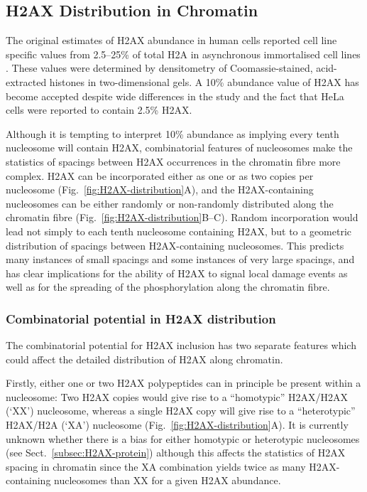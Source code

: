 \documentclass[graybox]{svmult}
\begin{document}
\subsection{H2AX Distribution in Chromatin}
\label{subsec:H2AX-distribution}
The original estimates of H2AX abundance in human cells reported cell line specific values from
2.5--25\% of total H2A in asynchronous immortalised cell lines \cite{EPR+98}. These values were
determined by densitometry of Coomassie-stained, acid-extracted histones in two-dimensional gels. A
10\% abundance value of H2AX has become accepted despite wide differences in the study and the fact
that HeLa cells were reported to contain 2.5\% H2AX\@.

Although it is tempting to interpret 10\% abundance as implying every tenth nucleosome will contain
H2AX, combinatorial features of nucleosomes make the statistics of spacings between H2AX occurrences
in the chromatin fibre more complex. H2AX can be incorporated either as one or as two copies per
nucleosome (Fig.~\ref{fig:H2AX-distribution}A), and the H2AX-containing nucleosomes can be either
randomly or non-randomly distributed along the chromatin fibre (Fig.~\ref{fig:H2AX-distribution}B--C).
Random incorporation would lead not simply to each tenth nucleosome containing H2AX, but to a
geometric distribution of spacings between H2AX-containing nucleosomes. This predicts many instances
of small spacings and some instances of very large spacings, and has clear implications for the
ability of \ugamma H2AX to signal local damage events as well as for the spreading of the
phosphorylation along the chromatin fibre.

\subsubsection{Combinatorial potential in H2AX distribution}
\label{subsubsec:Combinatorial-potential}
The combinatorial potential for H2AX inclusion has two separate features which could affect the
detailed distribution of H2AX along chromatin.

Firstly, either one or two H2AX polypeptides can in principle be present within a nucleosome: Two
H2AX copies would give rise to a ``homotypic'' H2AX/H2AX (`XX') nucleosome, whereas a single H2AX
copy will give rise to a ``heterotypic'' H2AX/H2A (`XA') nucleosome (Fig.~\ref{fig:H2AX-distribution}A).
It is currently unknown whether there is a bias for either homotypic or heterotypic nucleosomes
(see Sect.~\ref{subsec:H2AX-protein}) although this affects the statistics of H2AX spacing in
chromatin since the XA combination yields twice as many H2AX-containing nucleosomes than XX for a
given H2AX abundance.
\end{document}
